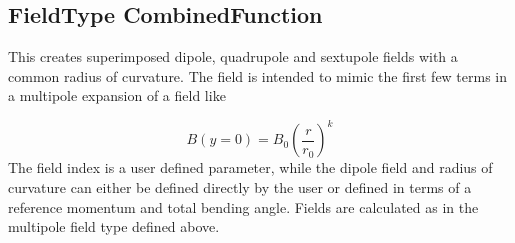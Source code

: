 \subsection{FieldType CombinedFunction}
This creates superimposed dipole, quadrupole and sextupole fields with a common radius of curvature. The field is
intended to mimic the first few terms in a multipole expansion of a field like

\begin{equation*}
B(y=0)=B_0\left(\frac r{r_0}\right)^k
\end{equation*}
The field index is a user defined parameter, while the dipole field and radius of curvature can either be defined
directly by the user or defined in terms of a reference momentum and total bending angle. Fields are calculated as in
the multipole field type defined above.

